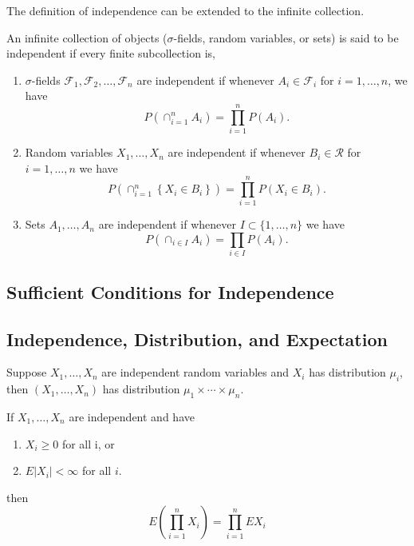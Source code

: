 The definition of independence can be extended to the infinite collection.

\begin{definition}{}{}
    An infinite collection of objects ($\sigma$-fields, random variables, or sets) is said to be independent if every finite subcollection is,
    \begin{enumerate}
        \item $\sigma$-fields $\mathcal{F}_{1},\mathcal{F}_{2},\ldots,\mathcal{F}_{n}$ are independent if whenever $A_{i}\in\mathcal{F}_{i}$ for $i=1, \ldots,n$, we have
        \begin{equation}
            P\left(\cap_{i=1}^{n}A_{i}\right)=\prod_{i=1}^{n}P\left(A_{i}\right).
        \end{equation}
        \item Random variables $X_{1},\ldots,X_{n}$ are independent if whenever $B_{i}\in\mathcal{R}$ for $i=1,\ldots,n$ we have
        \begin{equation}
            P\left(\cap_{i=1}^{n}\left\{X_{i}\in B_{i}\right\}\right)=\prod_{i=1}^{n}P\left(X_{i}\in B_{i}\right).
        \end{equation}
        \item Sets $A_{1},\ldots,A_{n}$ are independent if whenever $I\subset\{1,\ldots,n\}$ we have
        \begin{equation}
            P\left(\cap_{i\in I}A_{i}\right)=\prod_{i\in I}P\left(A_{i}\right).
        \end{equation}
    \end{enumerate}
\end{definition}

\subsection{Sufficient Conditions for Independence}

\subsection{Independence, Distribution, and Expectation}

\begin{theorem}{}{}
    Suppose $X_{1},\ldots,X_{n}$ are independent random variables and $X_{i}$ has distribution $\mu_{i}$, then $\left(X_{1},\ldots,X_{n}\right)$ has distribution $\mu_{1}\times\cdots\times\mu_{n}$.
\end{theorem}

\begin{theorem}{}{}
    If $X_{1},\ldots,X_{n}$ are independent and have
    \begin{enumerate}
        \item $X_{i} \geq 0$ for all i, or
        \item $E\left|X_{i}\right|<\infty$ for all $i$.
    \end{enumerate}
    then
    \begin{equation}
        E\left(\prod_{i=1}^{n}X_{i}\right)=\prod_{i=1}^{n}EX_{i}
    \end{equation}
\end{theorem}

